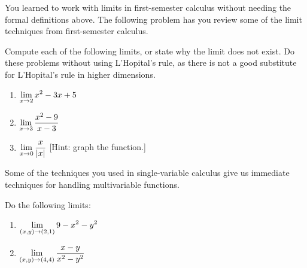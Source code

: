 You learned to work with limits in first-semester calculus without needing the formal definitions above. The following problem has you review some of the limit techniques from first-semester calculus.
\begin{problem}%
 Compute each of the following limits, or state why the limit does not exist. Do these problems without using L'Hopital's rule, as there is not a good substitute for L'Hopital's rule in higher dimensions. 
\begin{enumerate}
 \item $\displaystyle \lim_{x\to 2} x^2-3x+5$
 \item $\displaystyle\lim_{x\to 3}\frac{x^2-9}{x-3}$
 \item $\displaystyle\lim_{x\to 0}\frac{x}{|x|}$ [Hint: graph the function.]
\end{enumerate}
\end{problem}

Some of the techniques you used in single-variable calculus give us immediate techniques for handling multivariable functions.
\begin{problem} Do the following limits:
  \begin{enumerate}
  \item $\displaystyle\lim_{(x,y)\to (2,1)} 9-x^2-y^2$
  \item $\displaystyle\lim_{(x,y)\to (4,4)} \frac{x-y}{x^2-y^2}$
  \end{enumerate}
\end{problem}


